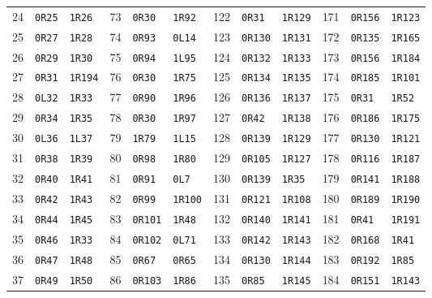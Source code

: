\begin{center}
\begin{tabular}{rll@{\hspace{12pt}}rll@{\hspace{12pt}}rll@{\hspace{12pt}}rll}
24 & \texttt{0R25} & \texttt{1R26} & 73 & \texttt{0R30} & \texttt{1R92} & 122 & \texttt{0R31} & \texttt{1R129} & 171 & \texttt{0R156} & \texttt{1R123}\\
25 & \texttt{0R27} & \texttt{1R28} & 74 & \texttt{0R93} & \texttt{0L14} & 123 & \texttt{0R130} & \texttt{1R131} & 172 & \texttt{0R135} & \texttt{1R165}\\
26 & \texttt{0R29} & \texttt{1R30} & 75 & \texttt{0R94} & \texttt{1L95} & 124 & \texttt{0R132} & \texttt{1R133} & 173 & \texttt{0R156} & \texttt{1R184}\\
27 & \texttt{0R31} & \texttt{1R194} & 76 & \texttt{0R30} & \texttt{1R75} & 125 & \texttt{0R134} & \texttt{1R135} & 174 & \texttt{0R185} & \texttt{1R101}\\
28 & \texttt{0L32} & \texttt{1R33} & 77 & \texttt{0R90} & \texttt{1R96} & 126 & \texttt{0R136} & \texttt{1R137} & 175 & \texttt{0R31} & \texttt{1R52}\\
29 & \texttt{0R34} & \texttt{1R35} & 78 & \texttt{0R30} & \texttt{1R97} & 127 & \texttt{0R42} & \texttt{1R138} & 176 & \texttt{0R186} & \texttt{1R175}\\
30 & \texttt{0L36} & \texttt{1L37} & 79 & \texttt{1R79} & \texttt{1L15} & 128 & \texttt{0R139} & \texttt{1R129} & 177 & \texttt{0R130} & \texttt{1R121}\\
31 & \texttt{0R38} & \texttt{1R39} & 80 & \texttt{0R98} & \texttt{1R80} & 129 & \texttt{0R105} & \texttt{1R127} & 178 & \texttt{0R116} & \texttt{1R187}\\
32 & \texttt{0R40} & \texttt{1R41} & 81 & \texttt{0R91} & \texttt{0L7} & 130 & \texttt{0R139} & \texttt{1R35} & 179 & \texttt{0R141} & \texttt{1R188}\\
33 & \texttt{0R42} & \texttt{1R43} & 82 & \texttt{0R99} & \texttt{1R100} & 131 & \texttt{0R121} & \texttt{1R108} & 180 & \texttt{0R189} & \texttt{1R190}\\
34 & \texttt{0R44} & \texttt{1R45} & 83 & \texttt{0R101} & \texttt{1R48} & 132 & \texttt{0R140} & \texttt{1R141} & 181 & \texttt{0R41} & \texttt{1R191}\\
35 & \texttt{0R46} & \texttt{1R33} & 84 & \texttt{0R102} & \texttt{0L71} & 133 & \texttt{0R142} & \texttt{1R143} & 182 & \texttt{0R168} & \texttt{1R41}\\
36 & \texttt{0R47} & \texttt{1R48} & 85 & \texttt{0R67} & \texttt{0R65} & 134 & \texttt{0R130} & \texttt{1R144} & 183 & \texttt{0R192} & \texttt{1R85}\\
37 & \texttt{0R49} & \texttt{1R50} & 86 & \texttt{0R103} & \texttt{1R86} & 135 & \texttt{0R85} & \texttt{1R145} & 184 & \texttt{0R151} & \texttt{1R143}\\

\end{tabular}
\end{center}
